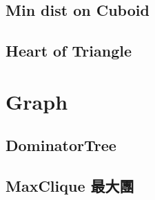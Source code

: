 \documentclass[a4paper,10pt,twocolumn,oneside]{article}
\begin{document}
%

% 

% 

%

\subsection{Min dist on Cuboid}


\subsection{Heart of Triangle}


\section{Graph}
% 

\subsection{DominatorTree}


\subsection{MaxClique 最大團}
% 

\end{document}
